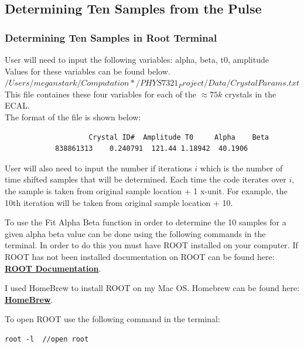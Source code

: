 \documentclass{article}
\begin{document}
\subsection{Determining Ten Samples from the Pulse} 

\subsubsection{Determining Ten Samples in Root Terminal} 
User will need to input the following variables: alpha, beta, t0, amplitude 
\\ Values for these variables can be found below. \\
$ /Users/meganstark/Computation*/PHYS7321_Project/Data/CrystalParams.txt $ \\ %
This file containes these four variables for each of the $\approx 75k$ crystals in the ECAL. 
\\

	
The format of the file is shown below: 
		\begin{verbatim} 
					Crystal ID#  Amplitude T0     Alpha    Beta 
			838861313    0.240791  121.44 1.18942  40.1906
\end{verbatim}

User will also need to input the number if iterations $i$ which is the number of time shifted samples that will be determined. Each time the code iterates over $i$, the sample is taken from original sample location + 1 x-unit. For example, the 10th iteration will be taken from original sample location + 10. 

\vspace{2mm}
To use the Fit Alpha Beta function in order to determine the 10 samples for a given alpha beta value can be done using the following commands in the terminal. 
\vspace{2mm}
In order to do this you must have ROOT installed on your computer. If ROOT has not been installed documentation on ROOT can be found here: \href{https://root.cern.ch}{\bf{ROOT Documentation}}.

I used HomeBrew to install ROOT on my Mac OS. Homebrew can be found here: \href{https://brew.sh}{\bf{HomeBrew}}.

\vspace{2mm}

To open ROOT use the following command in the terminal:

\begin{verbatim} 
root -l  //open root 
\end{verbatim}
\end{document}
